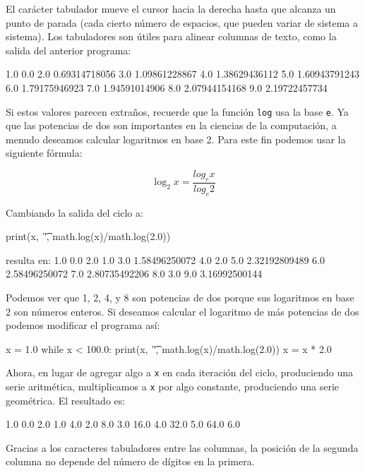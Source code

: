 El carácter tabulador mueve el cursor hacia la derecha hasta que alcanza
un punto de parada (cada cierto número de espacios, que pueden variar
de sistema a sistema). Los tabuladores son útiles para alinear columnas
de texto, como la salida del anterior programa:
\begin{pythoncode}
1.0     0.0
2.0     0.69314718056
3.0     1.09861228867
4.0     1.38629436112
5.0     1.60943791243
6.0     1.79175946923
7.0     1.94591014906
8.0     2.07944154168
9.0     2.19722457734
\end{pythoncode}
Si estos valores parecen extraños, recuerde que la función \texttt{log}
usa la base \texttt{e}. Ya que las potencias de dos son importantes
en la ciencias de la computación, a menudo deseamos calcular logaritmos
en base 2. Para este fin podemos usar la siguiente fórmula:

\begin{equation}
\log_{2}x=\frac{log_{e}x}{log_{e}2}
\end{equation}

Cambiando la salida del ciclo a:
\begin{pythoncode}
print(x, '\t',  math.log(x)/math.log(2.0))
\end{pythoncode}
\begin{pythoncode}
   resulta en:
1.0     0.0
2.0     1.0
3.0     1.58496250072
4.0     2.0
5.0     2.32192809489
6.0     2.58496250072
7.0     2.80735492206
8.0     3.0
9.0     3.16992500144
\end{pythoncode}
Podemos ver que 1, 2, 4, y 8 son potencias de dos porque sus logaritmos
en base 2 son números enteros. Si deseamos calcular el logaritmo de
más potencias de dos podemos modificar el programa así:
\begin{pythoncode}
x = 1.0
while x < 100.0:
  print(x, '\t', math.log(x)/math.log(2.0))
  x = x * 2.0
\end{pythoncode}

Ahora, en lugar de agregar algo a \texttt{x} en cada iteración del
ciclo, produciendo una serie aritmética, multiplicamos a \texttt{x}
por algo constante, produciendo una serie geométrica. El resultado
es:

 
\begin{pythoncode}
1.0     0.0
2.0     1.0
4.0     2.0
8.0     3.0
16.0    4.0
32.0    5.0
64.0    6.0
\end{pythoncode}
Gracias a los caracteres tabuladores entre las columnas, la posición
de la segunda columna no depende del número de dígitos en la primera.

